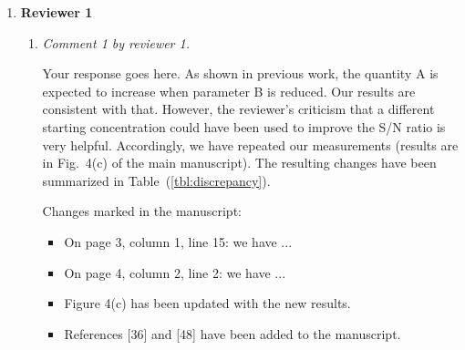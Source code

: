 \documentclass[12pt]{article}
\begin{document}
\begin{enumerate}
\item \textbf{Reviewer 1} %
  \begin{enumerate}
  \item \textit{Comment 1 by reviewer 1.}
    
    Your response goes here. As shown in previous work\cite{goossens:1994}, the quantity A is expected to increase when parameter B is reduced. Our results are consistent with that. However, the reviewer's criticism that a different starting concentration could have been used to improve the S/N ratio is very helpful. Accordingly, we have repeated our measurements (results are in Fig.~4(c) of the main manuscript). The resulting changes have been summarized in Table~(\ref{tbl:discrepancy}).

    \begin{table}[!ht]
      \centering
      \caption{Summary of discrepancy from earlier submitted results. This table should not be in the main manuscript.}
      \label{tbl:discrepancy}
    \end{table}
    
    Changes marked in the manuscript:
    
    \begin{itemize}
    \item On page 3, column 1, line 15: we have ...
    \item On page 4, column 2, line 2: we have ...
    \item Figure 4(c) has been updated with the new results.
    \item References [36] and [48] have been added to the manuscript.
    \end{itemize}
    

\end{enumerate}
\end{enumerate}
\end{document}
